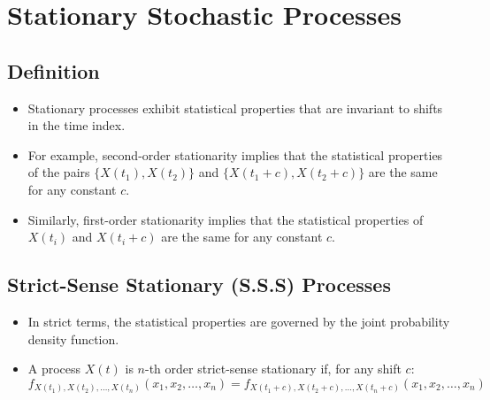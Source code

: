 \documentclass[12pt]{article}
\begin{document}
\section{Stationary Stochastic Processes}
\subsection{Definition}
\begin{itemize}
    \item Stationary processes exhibit statistical properties that are invariant to shifts in the time index.
    \item For example, second-order stationarity implies that the statistical properties of the pairs \( \{X(t_1), X(t_2)\} \) and \( \{X(t_1 + c), X(t_2 + c)\} \) are the same for any constant \( c \).
    \item Similarly, first-order stationarity implies that the statistical properties of \( X(t_i) \) and \( X(t_i + c) \) are the same for any constant \( c \).
\end{itemize}

\subsection{Strict-Sense Stationary (S.S.S) Processes}
\begin{itemize}
    \item In strict terms, the statistical properties are governed by the joint probability density function.
    \item A process \( X(t) \) is \( n \)-th order strict-sense stationary if, for any shift \( c \):
    \[
    f_{X(t_1), X(t_2), \ldots, X(t_n)}(x_1, x_2, \ldots, x_n) = f_{X(t_1 + c), X(t_2 + c), \ldots, X(t_n + c)}(x_1, x_2, \ldots, x_n)
    \]
\end{itemize}
\end{document}
